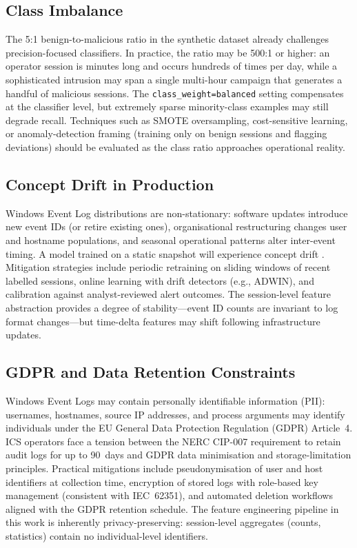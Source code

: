 \label{sec:disc}

\subsection{Class Imbalance}

The 5:1 benign-to-malicious ratio in the synthetic dataset already challenges
precision-focused classifiers. In practice, the ratio may be 500:1 or higher: an operator
session is minutes long and occurs hundreds of times per day, while a sophisticated
intrusion may span a single multi-hour campaign that generates a handful of malicious
sessions. The \texttt{class\_weight=balanced} setting compensates at the classifier level,
but extremely sparse minority-class examples may still degrade recall. Techniques such as
SMOTE oversampling, cost-sensitive learning, or anomaly-detection framing (training only
on benign sessions and flagging deviations) should be evaluated as the class ratio
approaches operational reality.

\subsection{Concept Drift in Production}

Windows Event Log distributions are non-stationary: software updates introduce new event
IDs (or retire existing ones), organisational restructuring changes user and hostname
populations, and seasonal operational patterns alter inter-event timing. A model trained
on a static snapshot will experience concept drift \cite{sommer2010outside}. Mitigation
strategies include periodic retraining on sliding windows of recent labelled sessions,
online learning with drift detectors (e.g., ADWIN), and calibration against analyst-reviewed
alert outcomes. The session-level feature abstraction provides a degree of stability—event
ID counts are invariant to log format changes—but time-delta features may shift following
infrastructure updates.

\subsection{GDPR and Data Retention Constraints}

Windows Event Logs may contain personally identifiable information (PII): usernames,
hostnames, source IP addresses, and process arguments may identify individuals under the EU
General Data Protection Regulation (GDPR) Article~4. ICS operators face a tension between
the NERC CIP-007 requirement to retain audit logs for up to 90~days and GDPR data
minimisation and storage-limitation principles. Practical mitigations include
pseudonymisation of user and host identifiers at collection time, encryption of stored logs
with role-based key management (consistent with IEC~62351), and automated deletion
workflows aligned with the GDPR retention schedule. The feature engineering pipeline in this
work is inherently privacy-preserving: session-level aggregates (counts, statistics) contain
no individual-level identifiers.

